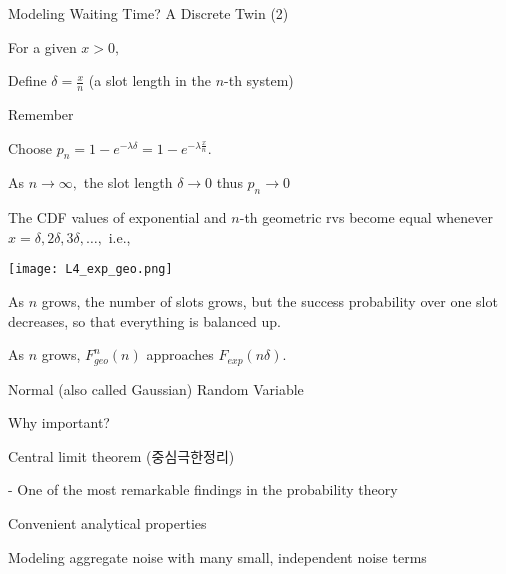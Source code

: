 \documentclass[fleqn,aspectratio=169]{beamer}
\begin{document}
\begin{frame}{Modeling Waiting Time? A Discrete Twin (2)}

{
For a given $x>0,$

\plitemsep 0.05in
\bci 
\item<2-> Define $\delta = \frac{x}{n}$ (a slot length in the $n$-th system)

\item<3-> Remember
\item<4-> Choose $p_n = 1-e^{-\lambda \delta} = 1-e^{-\lambda \frac{x}{n}}.$

\item<5-> As $n \rightarrow \infty,$ the slot length $\delta \rightarrow 0$ thus $p_n \rightarrow 0$ 

\item<5-> The CDF values of exponential and $n$-th geometric rvs become equal whenever $x =\delta, 2\delta, 3\delta, \ldots,$ i.e., 

\eci
}
{
\texttt{[image: L4\_exp\_geo.png]}
\small
\bci
\item<6-> As $n$ grows, the number of slots grows, but the success probability over one slot decreases, so that everything is balanced up. 
\item<7-> As $n$ grows, $F^n_{geo}(n)$ approaches $F_{exp}(n\delta).$
\eci
}
\end{frame}

\begin{frame}{Normal (also called Gaussian) Random Variable}

Why important?

\plitemsep 0.4in
\bci 
\item Central limit theorem (중심극한정리)

- One of the most remarkable findings in the probability theory

\item Convenient analytical properties

\item Modeling aggregate noise with many small, independent noise terms

\eci
\end{frame}
\end{document}
